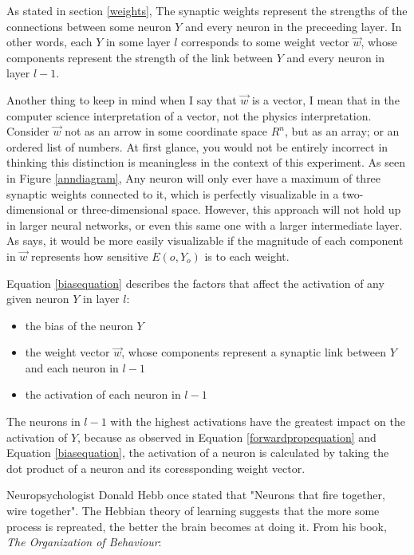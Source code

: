 \documentclass[12pt]{article}
\begin{document}
As stated in section \ref{weights}, The synaptic weights represent the strengths of the connections between some neuron $Y$ and every neuron in the preceeding layer. In other words, each $Y$ in some layer $l$ corresponds to some weight vector $\vec w$, whose components represent the strength of the link between $Y$ and every neuron in layer $l-1$.

Another thing to keep in mind when I say that $\vec w$ is a vector, I mean that in the computer science interpretation of a vector, not the physics interpretation. Consider $\vec{w}$ not as an arrow in some coordinate space $R^n$, but as an array; or an ordered list of numbers. At first glance, you would not be entirely incorrect in thinking this distinction is meaningless in the context of this experiment. As seen in Figure \ref{anndiagram}, Any neuron will only ever have a maximum of three synaptic weights connected to it, which is perfectly visualizable in a two-dimensional or three-dimensional space. However, this approach will not hold up in larger neural networks, or even this same one with a larger intermediate layer. As \textcite{DeepLearningCh3} says, it would be more easily visualizable if the magnitude of each component in $\vec w$ represents how sensitive $E(o, Y_o)$ is to each weight.

Equation \ref{biasequation} describes the factors that affect the activation of any given neuron $Y$ in layer $l$:

\begin{itemize}
    \item the bias of the neuron $Y$
    \item the weight vector $\vec{w}$, whose components represent a synaptic link  between $Y$ and each neuron in $l - 1$
    \item the activation of each neuron in $l - 1$
\end{itemize}

The neurons in $l - 1$ with the highest activations have the greatest impact on the activation of $Y$, because as observed in Equation \ref{forwardpropequation} and Equation \ref{biasequation}, the activation of a neuron is calculated by taking the dot product of a neuron and its coressponding weight vector.

Neuropsychologist Donald Hebb once stated that "Neurons that fire together, wire together". The Hebbian theory of learning suggests that the more some process is repreated, the better the brain becomes at doing it. From his book, \textit{The Organization of Behaviour}:
\end{document}
